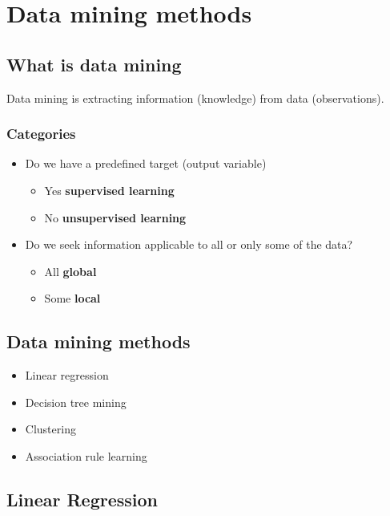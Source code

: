 \chapter{Data mining methods}

\section{What is data mining}

Data mining is extracting information (knowledge) from data (observations).

\subsection{Categories}
\begin{itemize}
    \item Do we have a predefined target (output variable)
        \begin{itemize}
            \item Yes \textrightarrow \textbf{ supervised learning}
            \item No \textrightarrow \textbf{ unsupervised learning}
        \end{itemize}
    \item Do we seek information applicable to all or only some of the data?
        \begin{itemize}
            \item All \textrightarrow \textbf{ global}
            \item Some \textrightarrow \textbf{ local}
        \end{itemize}
\end{itemize}

\section{Data mining methods}

\begin{itemize}
    \item Linear regression
    \item Decision tree mining
    \item Clustering
    \item Association rule learning
\end{itemize}

\section{Linear Regression}

